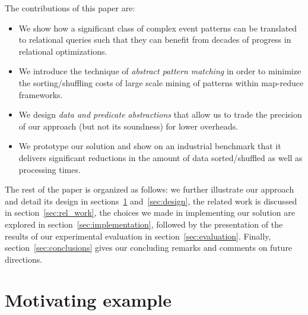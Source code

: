The contributions of this paper are:
\begin{itemize}
	\item We show how a significant class of complex event patterns can be 
	translated to relational queries such that they can benefit from decades of 
	progress in relational optimizations.
	\item We introduce the technique of {\em abstract pattern matching} in 
	order to minimize the sorting/shuffling costs of large scale mining of 
	patterns within map-reduce frameworks.
	\item We design {\em data and predicate abstractions} that allow us to 
	trade the precision of our approach (but not its soundness) for lower 
	overheads.
	\item We prototype our solution and show on an industrial benchmark that 
	it delivers significant reductions in the amount of data sorted/shuffled as 
	well as processing times.  
\end{itemize}


The rest of the paper is organized as follows: 
we further illustrate our approach and detail its design in 
sections~\ref{sec:mot_example} and~\ref{sec:design},
the related work is discussed in section~\ref{sec:rel_work},  
the choices we made in implementing our solution are explored in 
section~\ref{sec:implementation}, followed by the presentation of the results 
of our experimental evaluation in section~\ref{sec:evaluation}. 
Finally, section~\ref{sec:conclusions} gives our concluding remarks and 
comments on future directions.   











\section{Motivating example}
\label{sec:mot_example}

